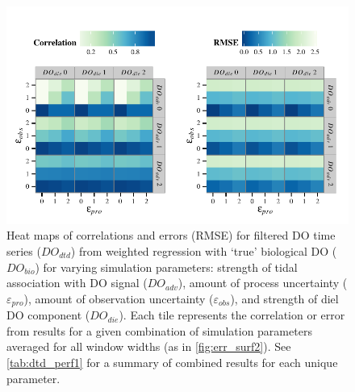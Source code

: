 \documentclass[letterpaper,12pt,oneside]{article}\usepackage[]{graphicx}\usepackage[]{color}
\makeatletter
\def\maxwidth{ %
  \ifdim\Gin@nat@width>\linewidth
    \linewidth
  \else
    \Gin@nat@width
  \fi
}
\newenvironment{knitrout}{}{} %
\makeatother
\begin{document}
\centering\vspace*{\fill}
\begin{knitrout}
\color{fgcolor}\begin{figure}[!ht]


{\centering \includegraphics[width=\maxwidth]{figure/err_surf1} 

}

\caption[Heat maps of correlations and errors (\ac{RMSE}) for filtered \ac{DO} time series ($DO_{dtd}$) from weighted regression with `true' biological \ac{DO} ($DO_{bio}$) for varying simulation parameters]{Heat maps of correlations and errors (\ac{RMSE}) for filtered \ac{DO} time series ($DO_{dtd}$) from weighted regression with `true' biological \ac{DO} ($DO_{bio}$) for varying simulation parameters: strength of tidal association with \ac{DO} signal ($DO_{adv}$), amount of process uncertainty ($\varepsilon_{pro}$), amount of observation uncertainty ($\varepsilon_{obs}$), and strength of diel \ac{DO} component ($DO_{die}$).  Each tile represents the correlation or error from results for a given combination of simulation parameters averaged for all window widths (as in \cref{fig:err_surf2}).  See \cref{tab:dtd_perf1} for a summary of combined results for each unique parameter.\label{fig:err_surf1}}
\end{figure}


\end{knitrout}
\vfill
\clearpage
\end{document}
